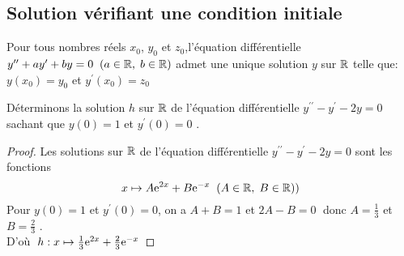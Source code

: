 \subsection*{Solution vérifiant une condition initiale}
\begin{property}
Pour tous nombres réels $x_{0} $, $ y_{0} $  et $z_{0} $,\;l'équation différentielle $ y^{\prime \prime}+ ay^{\prime}+by=0\;\;(a\in\mathbb{R},\; b\in\mathbb{R})$ admet une unique solution  $ y $ sur $ \mathbb{R} $ telle que: $ y(x_{0})=y_{0} $ et  $ y^{\prime}(x_{0})=z_{0} $
\end{property}
\begin{example}
Déterminons la solution $ h $ sur $ \mathbb{R} $  de l'équation différentielle\;  $ y^{\prime \prime}-y^{\prime} -2y=0 $\; sachant que  $ y(0)=1 $ et $ y^{\prime}(0)=0 $ . 

\end{example}
\begin{proof}
 Les solutions sur $ \mathbb{R} $ de l'équation différentielle  \;$ y^{\prime \prime}-y^{\prime}-2y=0 $  sont les fonctions
$$ x\mapsto A\mathrm{e}^{2 x}+B\mathrm{e}^{-x} \;\;(A\in\mathbb{R},\; B\in\mathbb{R}))$$  
Pour  $ y(0)=1 $ et $ y^{\prime}(0)=0 $, on a $ A+B=1 $  et $ 2A-B=0 \; $ donc  $ A=\frac{1}{3}$ et $B=\frac{2}{3} $ . \\
D'où  $\; h: x\mapsto \frac{1}{3} \mathrm{e}^{2 x}+\frac{2}{3}\mathrm{e}^{-x}$

\end{proof}

